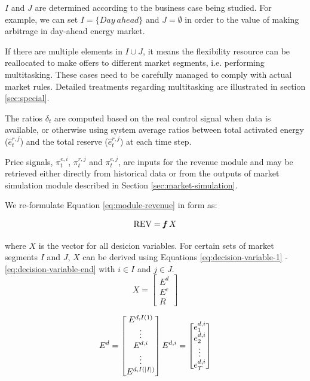 $I$ and $J$ are determined according to the business case being studied. For example, we can set $I = \{Day~ahead\}$ and $J=\emptyset$ in order to the value of making arbitrage in day-ahead energy market. 

If there are multiple elements in $I \cup J$, it means the flexibility resource can be reallocated to make offers to different market segments, i.e. performing multitasking. These cases need to be carefully managed to comply with actual market rules. Detailed treatments regarding multitasking are illustrated in section \ref{sec:special}.

The ratios $\delta_t$ are computed based on the real control signal when data is available, or otherwise using system average ratios between total activated energy ($\hat{e}_t^{r,j}$) and the total reserve ($\hat{e}_t^{r,j}$) at each time step.


Price signals, $\pi_t^{e,i}$, $\pi_t^{r,j}$ and $\pi_t^{e,j}$, are inputs for the revenue module and may be retrieved either directly from historical data or from the outputs of market simulation module described in Section \ref{sec:market-simulation}.

We re-formulate Equation \eqref{eq:module-revenue} in form as:

\begin{equation*}
\text{REV} = \textit{\textbf{f}}~X
\end{equation*}

where $X$ is the vector for all desicion variables. For certain sets of market segments $I$ and $J$, $X$ can be derived using Equations \eqref{eq:decision-variable-1} - \eqref{eq:decision-variable-end} with $i \in I$ and $j \in J$.
\begin{equation}
\label{eq:decision-variable-1}
X =
\begin{bmatrix}
E^d \\ E^c \\ R
\end{bmatrix}
\end{equation}

\begin{equation}
E^d =
\begin{bmatrix}
E^{d,I(1)} \\ \vdots \\ E^{d,i} \\ \vdots \\ E^{d,I(|I|)}
\end{bmatrix} \\
E^{d,i} = 
\begin{bmatrix}
e_1^{d,i}\\e_2^{d,i}\\\vdots\\e_T^{d,i}
\end{bmatrix}
\end{equation}

